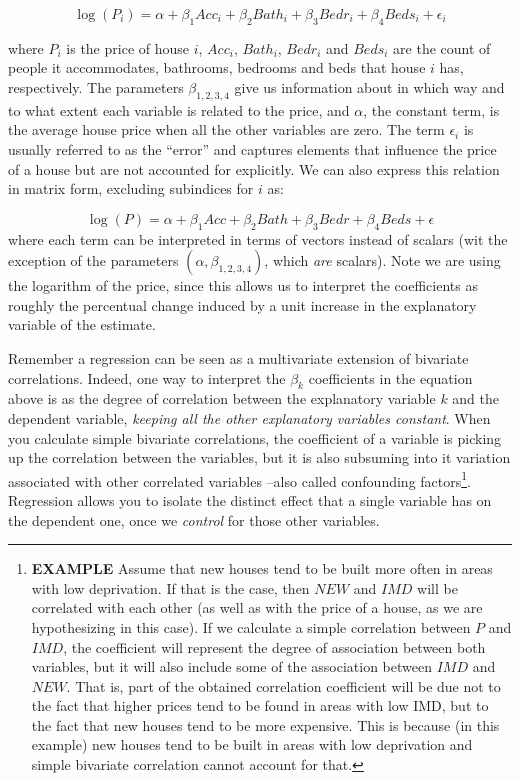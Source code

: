 \documentclass[
]{book}
\begin{document}
\[
\log(P_i) = \alpha + \beta_1 Acc_i + \beta_2 Bath_i + \beta_3 Bedr_i + \beta_4 Beds_i + \epsilon_i
\]

where \(P_i\) is the price of house \(i\), \(Acc_i\), \(Bath_i\), \(Bedr_i\) and \(Beds_i\) are the count of people it accommodates, bathrooms, bedrooms and beds that house \(i\) has, respectively. The parameters \(\beta_{1,2, 3, 4}\) give us information about in which way and to what extent each variable is related to the price, and \(\alpha\), the constant term, is the average house price when all the other variables are zero. The term \(\epsilon_i\) is usually referred to as the ``error'' and captures elements that influence the price of a house but are not accounted for explicitly. We can also express this relation in matrix form, excluding subindices for \(i\) as:

\[
\log(P) = \alpha + \beta_1 Acc + \beta_2 Bath + \beta_3 Bedr + \beta_4 Beds + \epsilon
\]
where each term can be interpreted in terms of vectors instead of scalars (wit the exception of the parameters \((\alpha, \beta_{1, 2, 3, 4})\), which \emph{are} scalars). Note we are using the logarithm of the price, since this allows us to interpret the coefficients as roughly the percentual change induced by a unit increase in the explanatory variable of the estimate.

Remember a regression can be seen as a multivariate extension of bivariate correlations. Indeed, one way to interpret the \(\beta_k\) coefficients in the equation above is as the degree of correlation between the explanatory variable \(k\) and the dependent variable, \emph{keeping all the other explanatory variables constant}. When you calculate simple bivariate correlations, the coefficient of a variable is picking up the correlation between the variables, but it is also subsuming into it variation associated with other correlated variables --also called confounding factors\footnote{\textbf{EXAMPLE} Assume that new houses tend to be built more often in areas with low deprivation. If that is the case, then \(NEW\) and \(IMD\) will be correlated with each other (as well as with the price of a house, as we are hypothesizing in this case). If we calculate a simple correlation between \(P\) and \(IMD\), the coefficient will represent the degree of association between both variables, but it will also include some of the association between \(IMD\) and \(NEW\). That is, part of the obtained correlation coefficient will be due not to the fact that higher prices tend to be found in areas with low IMD, but to the fact that new houses tend to be more expensive. This is because (in this example) new houses tend to be built in areas with low deprivation and simple bivariate correlation cannot account for that.}. Regression allows you to isolate the distinct effect that a single variable has on the dependent one, once we \emph{control} for those other variables.
\end{document}
